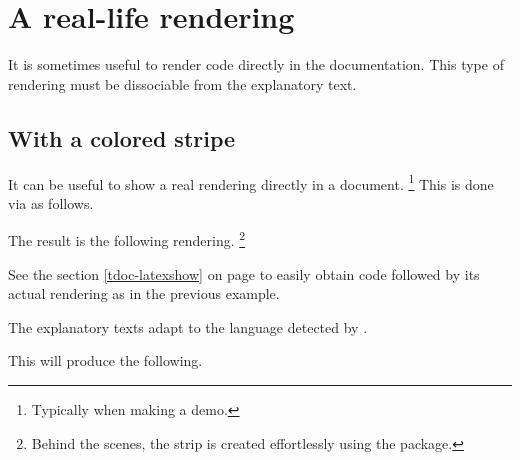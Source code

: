 \documentclass[10pt, a4paper]{tutodoc}
\begin{document}
\section{A real-life rendering} \label{tdoc-showcase}

It is sometimes useful to render code directly in the documentation. This type of rendering must be dissociable from the explanatory text.



\subsection{With a colored stripe} \label{tdoc-color-macros}

\begin{tdocexa} 
    It can be useful to show a real rendering directly in a document.
    \footnote{
        Typically when making a demo.
    }
    This is done via  as follows.


    The result is the following rendering.
    \footnote{
        Behind the scenes, the strip is created effortlessly using the  package.
    }
\end{tdocexa}




\smallskip

\begin{tdocrem}
    See the section \ref{tdoc-latexshow} on page \pageref{tdoc-latexshow} to easily obtain code followed by its actual rendering as in the previous example.
\end{tdocrem}


\begin{tdocnote}
    The explanatory texts adapt to the language detected by \thisproj.
\end{tdocnote}




\begin{tdocexa}
    \leavevmode


    This will produce the following.

    \medskip

    
\end{tdocexa}
\end{document}
